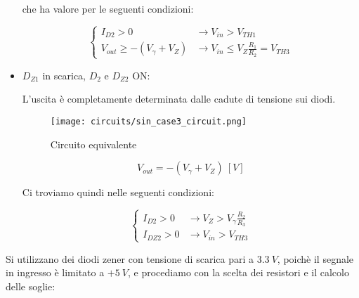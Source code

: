 \begin{itemize}
          che ha valore per le seguenti condizioni:

          \begin{equation}
              \left\{
              \begin{array}{ll}
                  I_{D2}> 0                    & \rightarrow V_{in}>V_{TH1}                        \\
                  V_{out}\geq-(V_{\gamma}+V_Z) & \rightarrow V_{in}\leq V_Z\frac{R_1}{R_2}=V_{TH3}
              \end{array}
              \right.
          \end{equation}

    \item $D_{Z1}$ in scarica, $D_2$ e $D_{Z2}$ ON:

          L'uscita è completamente determinata dalle cadute di tensione sui diodi.

          \begin{minipage}{0.45\textwidth}
              \centering
              \begin{figure}[H]
                  \centering
                  \texttt{[image: circuits/sin\_case3\_circuit.png]}
                  \caption{Circuito equivalente}
                  \label{sin_case3_circuit}
              \end{figure}
          \end{minipage}
          \begin{minipage}{0.45\textwidth}
              \centering
              \begin{equation}
                  V_{out}=-(V_{\gamma}+V_Z)\ [V]
              \end{equation}
          \end{minipage}

          Ci troviamo quindi nelle seguenti condizioni:

          \begin{equation}
              \left\{
              \begin{array}{ll}
                  I_{D2}> 0  & \rightarrow V_Z>V_\gamma\frac{R_2}{R_3} \\
                  I_{DZ2}> 0 & \rightarrow V_{in}>V_{TH3}
              \end{array}
              \right.
          \end{equation}

\end{itemize}

Si utilizzano dei diodi zener con tensione di scarica pari a $3.3\ V$, poichè il segnale in
ingresso è limitato a $+5\ V$, e procediamo con la scelta dei resistori e il calcolo delle
soglie:

